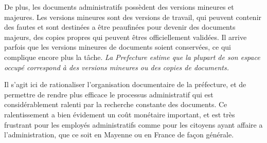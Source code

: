 De plus, les documents administratifs possèdent des versions mineures et majeures.
Les versions mineures sont des versions de travail, qui peuvent contenir des fautes et sont destinées a être peaufinées pour devenir des documents majeurs, des copies propres qui peuvent êtres officiellement validées.
Il arrive parfois que les versions mineures de documents soient conservées, ce qui complique encore plus la tâche.
\emph{La Prefecture estime que la plupart de son espace occupé correspond à des versions mineures ou des copies de documents.}


Il s'agit ici de rationaliser l'organisation documentaire de la préfecture, et de permettre de rendre plus efficace le processus administratif qui est considérablement ralenti par la recherche constante des documents.
Ce ralentissement a bien évidement un coût monétaire important, et est très frustrant pour les employés administratifs comme pour les citoyens ayant affaire a l'administration, que ce soit en Mayenne ou en France de façon générale. 

